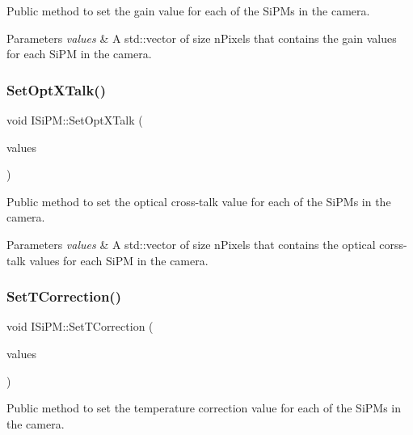 Public method to set the gain value for each of the Si\+P\+Ms in the camera. 


\begin{DoxyParams}{Parameters}
{\em values} & A std\+::vector of size n\+Pixels that contains the gain values for each Si\+PM in the camera. \\
\hline
\end{DoxyParams}
\mbox{\label{classISiPM_a656bda14a56128160c5ff06f01ec8c1e}} 
\subsubsection{\texorpdfstring{Set\+Opt\+X\+Talk()}{SetOptXTalk()}}
{\footnotesize\ttfamily void I\+Si\+P\+M\+::\+Set\+Opt\+X\+Talk (\begin{DoxyParamCaption}\item[{std\+::vector$<$ double $>$}]{values }\end{DoxyParamCaption})}



Public method to set the optical cross-\/talk value for each of the Si\+P\+Ms in the camera. 


\begin{DoxyParams}{Parameters}
{\em values} & A std\+::vector of size n\+Pixels that contains the optical corss-\/talk values for each Si\+PM in the camera. \\
\hline
\end{DoxyParams}
\mbox{\label{classISiPM_a915471416f44f92380cc450dce689e25}} 
\subsubsection{\texorpdfstring{Set\+T\+Correction()}{SetTCorrection()}}
{\footnotesize\ttfamily void I\+Si\+P\+M\+::\+Set\+T\+Correction (\begin{DoxyParamCaption}\item[{std\+::vector$<$ double $>$}]{values }\end{DoxyParamCaption})}



Public method to set the temperature correction value for each of the Si\+P\+Ms in the camera. 

